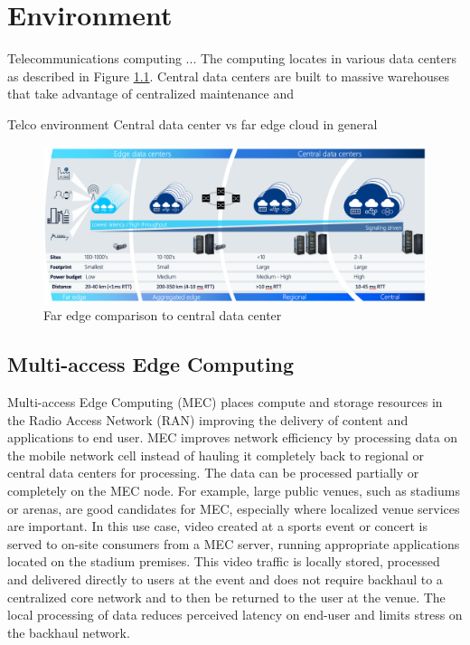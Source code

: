 \chapter{Environment}
\label{chapter:environment}

Telecommunications computing ... The computing locates in various data centers as described in Figure \ref{fig:AirFrame}. Central data centers are built to massive warehouses that take advantage of centralized maintenance and 

Telco environment
Central data center vs far edge cloud in general

\begin{figure}[ht]
  \begin{center}
    \includegraphics[width=13.5cm]{LaTeX/images/AirFrame.png}
    \caption{Far edge comparison to central data center \cite{AirFrameOpenEdgeServer}}
    \label{fig:AirFrame}
  \end{center}
\end{figure}

\section{Multi-access Edge Computing}

Multi-access Edge Computing (MEC) places compute and storage resources in the Radio Access Network (RAN) improving the delivery of content and applications to end user. MEC improves network efficiency by processing data on the mobile network cell instead of hauling it completely back to regional or central data centers for processing. The data can be processed partially or completely on the MEC node. For example, large public venues, such as stadiums or arenas, are good candidates for MEC, especially where localized venue services are important. In this use case, video created at a sports event or concert is served to on-site consumers from a MEC server, running appropriate applications located on the stadium premises. This video traffic is locally stored, processed and delivered directly to users at the event and does not require backhaul to a centralized core network and to then be returned to the user at the venue. The local processing of data reduces perceived latency on end-user and limits stress on the backhaul network. \cite{Brown2016}

